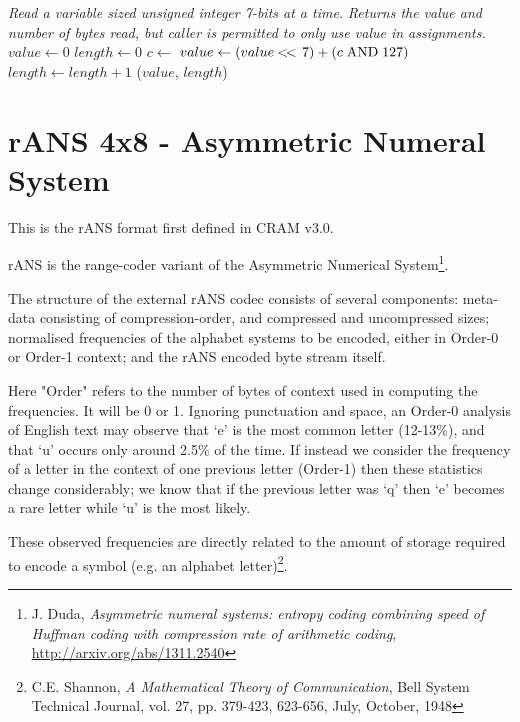 \documentclass[a4paper]{article}
\begin{document}
\begin{algorithmic}[1]
\Statex
\Statex \textit{Read a variable sized unsigned integer 7-bits at a time.}
\Statex \textit{Returns the value and number of bytes read, but caller is permitted to only use value in assignments.}
 
  \State $value \gets 0$
  \State $length \gets 0$
  \Repeat
    \State $c \gets$ 
    \State $value \gets (value \shiftl 7) + (c \bitand 127)$
    \State $length \gets length + 1$
  \State \Return ($value$, $length$) 
  \EndFunction
\end{algorithmic}

\section{rANS 4x8 - Asymmetric Numeral System}


This is the rANS format first defined in CRAM v3.0.

rANS is the range-coder variant of the Asymmetric Numerical
System\footnote{J. Duda, \textit{Asymmetric numeral systems: entropy
    coding combining speed of Huffman coding with compression rate of
    arithmetic coding}, \url{http://arxiv.org/abs/1311.2540}}.

The structure of the external rANS codec consists of several
components: meta-data consisting of compression-order, and compressed
and uncompressed sizes; normalised frequencies of the alphabet systems
to be encoded, either in Order-0 or Order-1 context; and the rANS
encoded byte stream itself.

Here "Order" refers to the number of bytes of context used in
computing the frequencies. It will be 0 or 1.  Ignoring punctuation
and space, an Order-0 analysis of English text may observe that `e' is
the most common letter (12-13\%), and that `u' occurs only around 2.5\%
of the time.  If instead we consider the frequency of a letter in the
context of one previous letter (Order-1) then these statistics change
considerably;  we know that if the previous letter was `q' then `e'
becomes a rare letter while `u' is the most likely.

These observed frequencies are directly related to the amount of
storage required to encode a symbol (e.g. an alphabet
letter)\footnote{ C.E. Shannon, \textit{A Mathematical Theory of
    Communication}, Bell System Technical Journal, vol. 27,
    pp. 379-423, 623-656, July, October, 1948}.
\end{document}
